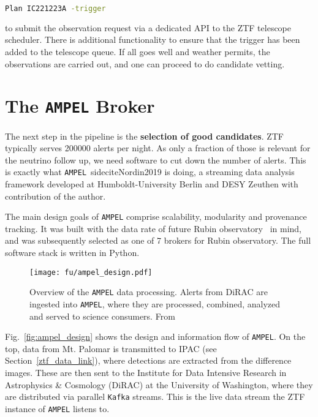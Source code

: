 \begin{lstlisting}[language=bash,style=kaolstplain]
Plan IC221223A -trigger
\end{lstlisting}

to submit the observation request via a dedicated API to the ZTF telescope scheduler. There is additional functionality to ensure that the trigger has been added to the telescope queue. If all goes well and weather permits, the observations are carried out, and one can proceed to do candidate vetting.

\section{The \texttt{AMPEL} Broker}\label{ampel}

The next step in the pipeline is the \textbf{selection of good candidates}. ZTF typically serves 200000 alerts per night. As only a fraction of those is relevant for the neutrino follow up, we need software to cut down the number of alerts. This is exactly what \texttt{AMPEL}~sidecite{Nordin2019} is doing, a streaming data analysis framework developed at Humboldt-University Berlin and DESY Zeuthen with contribution of the author.

The main design goals of \texttt{AMPEL} comprise scalability, modularity and provenance tracking. It was built with the data rate of future Rubin observatory~ in mind, and was subsequently selected as one of 7 brokers for Rubin observatory. The full software stack is written in Python.

\begin{figure}[h!]
    \texttt{[image: fu/ampel\_design.pdf]}
    \caption[\texttt{AMPEL} overview]{Overview of the \texttt{AMPEL} data processing. Alerts from DiRAC are ingested into \texttt{AMPEL}, where they are processed, combined, analyzed and served to science consumers. From~\cite{Nordin2019}}
\end{figure}

Fig.~\ref{fig:ampel_design} shows the design and information flow of \texttt{AMPEL}. On the top, data from Mt. Palomar is transmitted to IPAC (see Section~\ref{ztf_data_link}), where detections are extracted from the difference images. These are then sent to the Institute for Data Intensive Research in Astrophysics \& Cosmology (DiRAC) at the University of Washington, where they are distributed via parallel \texttt{Kafka} streams. This is the live data stream the ZTF instance of \texttt{AMPEL} listens to.

